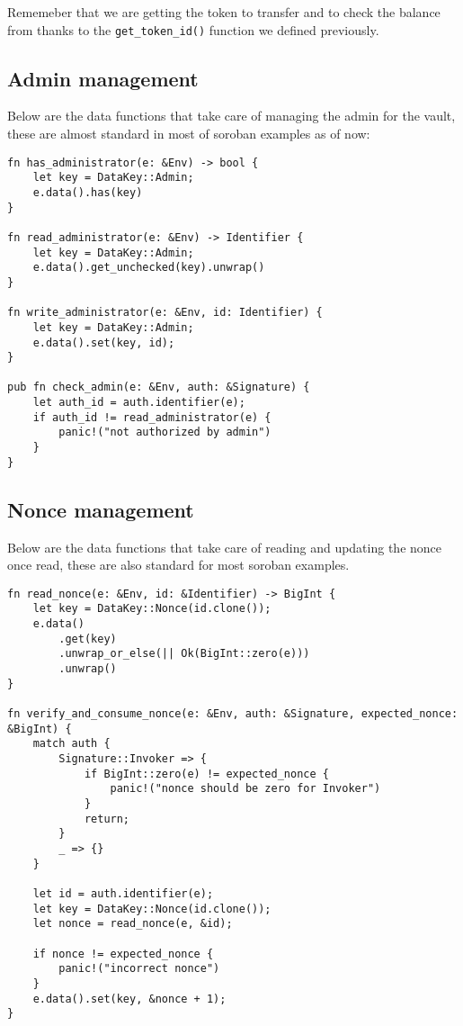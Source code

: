 \documentclass{article}
\newcommand{\inl}[1]{\lstinline{#1}}
\begin{document}
Rememeber that we are getting the token to transfer and to check the balance from thanks to the \inl{get_token_id()} function we defined previously.


\subsection{Admin management}
Below are the data functions that take care of managing the admin for the vault, these are almost standard in most of soroban examples as of now:

\begin{lstlisting}
fn has_administrator(e: &Env) -> bool {
    let key = DataKey::Admin;
    e.data().has(key)
}

fn read_administrator(e: &Env) -> Identifier {
    let key = DataKey::Admin;
    e.data().get_unchecked(key).unwrap()
}

fn write_administrator(e: &Env, id: Identifier) {
    let key = DataKey::Admin;
    e.data().set(key, id);
}

pub fn check_admin(e: &Env, auth: &Signature) {
    let auth_id = auth.identifier(e);
    if auth_id != read_administrator(e) {
        panic!("not authorized by admin")
    }
}
\end{lstlisting}

\subsection{Nonce management}
Below are the data functions that take care of reading and updating the nonce once read, these are also standard for most soroban examples.

\begin{lstlisting}
fn read_nonce(e: &Env, id: &Identifier) -> BigInt {
    let key = DataKey::Nonce(id.clone());
    e.data()
        .get(key)
        .unwrap_or_else(|| Ok(BigInt::zero(e)))
        .unwrap()
}

fn verify_and_consume_nonce(e: &Env, auth: &Signature, expected_nonce: &BigInt) {
    match auth {
        Signature::Invoker => {
            if BigInt::zero(e) != expected_nonce {
                panic!("nonce should be zero for Invoker")
            }
            return;
        }
        _ => {}
    }

    let id = auth.identifier(e);
    let key = DataKey::Nonce(id.clone());
    let nonce = read_nonce(e, &id);

    if nonce != expected_nonce {
        panic!("incorrect nonce")
    }
    e.data().set(key, &nonce + 1);
}
\end{lstlisting}
\end{document}

